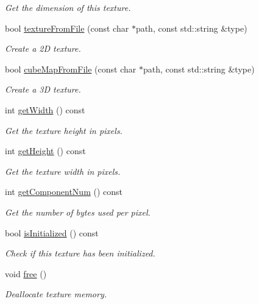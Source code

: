 \begin{DoxyCompactItemize}
\begin{DoxyCompactList}\small\item\em Get the dimension of this texture. \end{DoxyCompactList}\item 
bool \mbox{\hyperlink{classec_1_1_texture_ac2461a696b914d1b22192a87d326f480}{texture\+From\+File}} (const char $\ast$path, const std\+::string \&type)
\begin{DoxyCompactList}\small\item\em Create a 2D texture. \end{DoxyCompactList}\item 
bool \mbox{\hyperlink{classec_1_1_texture_ae84b0f18fa11275f09e4c8ea3dc89e02}{cube\+Map\+From\+File}} (const char $\ast$path, const std\+::string \&type)
\begin{DoxyCompactList}\small\item\em Create a 3D texture. \end{DoxyCompactList}\item 
int \mbox{\hyperlink{classec_1_1_texture_a0c01b293f7fe1b9ee863a1a2e9b64a6f}{get\+Width}} () const
\begin{DoxyCompactList}\small\item\em Get the texture height in pixels. \end{DoxyCompactList}\item 
int \mbox{\hyperlink{classec_1_1_texture_a45ff89dd7453c2d09ec10ba8aa58835c}{get\+Height}} () const
\begin{DoxyCompactList}\small\item\em Get the texture width in pixels. \end{DoxyCompactList}\item 
int \mbox{\hyperlink{classec_1_1_texture_a941dc88bd9843fcf8273dc8d8a259c03}{get\+Component\+Num}} () const
\begin{DoxyCompactList}\small\item\em Get the number of bytes used per pixel. \end{DoxyCompactList}\item 
bool \mbox{\hyperlink{classec_1_1_texture_ab81c62fde2f54dfbb5895a421224fcd9}{is\+Initialized}} () const
\begin{DoxyCompactList}\small\item\em Check if this texture has been initialized. \end{DoxyCompactList}\item 
void \mbox{\hyperlink{classec_1_1_texture_a57242daae8cc1ea827848f9b7f7b7fbb}{free}} ()
\begin{DoxyCompactList}\small\item\em Deallocate texture memory. \end{DoxyCompactList}\end{DoxyCompactItemize}


